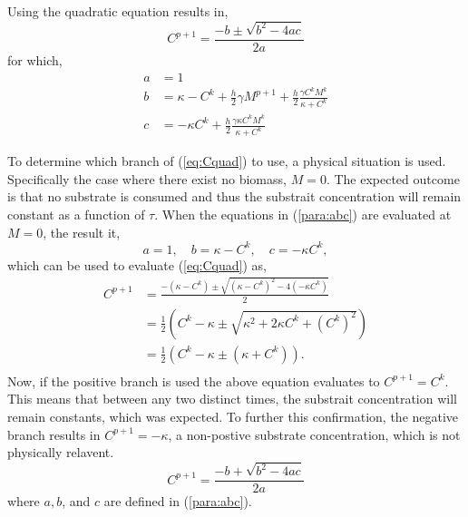 Using the quadratic equation results in, 
  \begin{equation} \label{eq:Cquad}
    C^{p+1} = \frac{-b \pm \sqrt{b^2 - 4ac}}{2a}
  \end{equation}  
  for which, 
  \begin{equation} \begin{aligned} \label{para:abc}
    a &= 1\\
    b &= \kappa - C^k + \frac{h}{2} \gamma M^{p+1} + \frac{h}{2} \frac{\gamma C^k M^k}{\kappa + C^k} \\
    c &= -\kappa C^k + \frac{h}{2} \frac{\gamma \kappa C^k M^k}{\kappa + C^k}
  \end{aligned}  \end{equation}
  
  To determine which branch of (\ref{eq:Cquad}) to use, a physical situation is used. 
  Specifically the case where there exist no biomass, $M = 0$. 
  The expected outcome is that no substrate is consumed and thus the substrait concentration will remain constant as a function of $\tau$. 
  When the equations in (\ref{para:abc}) are evaluated at $M = 0$, the result it,
  \begin{equation}
    a = 1, \quad b = \kappa - C^k, \quad c = -\kappa C^k,
  \end{equation} 
  which can be used to evaluate (\ref{eq:Cquad}) as,
  \begin{equation} \begin{aligned}
    C^{p+1} &= \frac{- (\kappa - C^k) \pm \sqrt{(\kappa - C^k)^2 - 4 (-\kappa C^k)}}{2} \\
      &= \frac{1}{2} \left( C^k - \kappa \pm \sqrt{\kappa^2 + 2 \kappa C^k + \left(C^k \right) ^2}\right) \\
      &= \frac{1}{2} \left( C^k - \kappa \pm (\kappa+C^k) \right). \\
  \end{aligned} \end{equation}
  Now, if the positive branch is used the above equation evaluates to $C^{p+1} = C^k$. 
  This means that between any two distinct times, the substrait concentration will remain constants, which was expected. 
  To further this confirmation, the negative branch results in $C^{p+1} = -\kappa $, a non-postive substrate concentration, which is not physically relavent. 
  \begin{equation}
    C^{p+1} = \frac{-b + \sqrt{b^2 - 4ac}}{2a}
  \end{equation} 
  where $a,b$, and $c$ are defined in (\ref{para:abc}).


